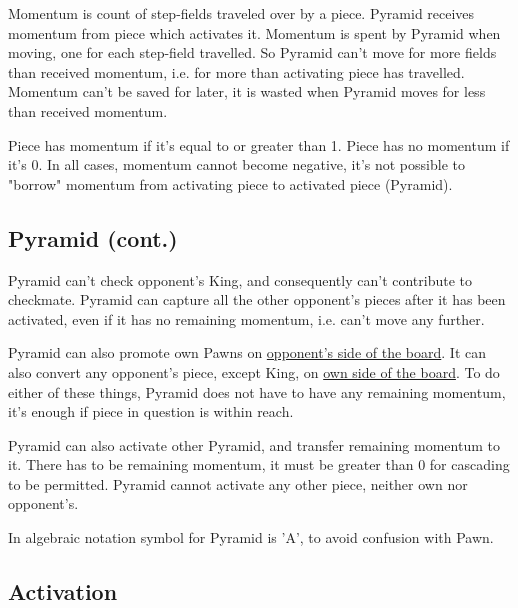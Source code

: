 Momentum is count of step-fields traveled over by a piece. Pyramid receives
momentum from piece which activates it. Momentum is spent by Pyramid when
moving, one for each step-field travelled. So Pyramid can't move for more
fields than received momentum, i.e. for more than activating piece has
travelled. Momentum can't be saved for later, it is wasted when Pyramid
moves for less than received momentum.

Piece has momentum if it's equal to or greater than 1. Piece has no momentum
if it's 0. In all cases, momentum cannot become negative, it's not possible
to "borrow" momentum from activating piece to activated piece (Pyramid).

\clearpage %

\subsection*{Pyramid (cont.)}

Pyramid can't check opponent's King, and consequently can't contribute to
checkmate. Pyramid can capture all the other opponent's pieces after it has
been activated, even if it has no remaining momentum, i.e. can't move any
further.

Pyramid can also promote own Pawns on
\hyperref[sec:Definitions/Sides of a chessboard]{opponent's side of the board}.
It can also convert any opponent's piece, except King, on
\hyperref[sec:Definitions/Sides of a chessboard]{own side of the board}.
To do either of these things, Pyramid does not have to have any remaining
momentum, it's enough if piece in question is within reach.

Pyramid can also activate other Pyramid, and transfer remaining momentum to it.
There has to be remaining momentum, it must be greater than 0 for cascading
to be permitted. Pyramid cannot activate any other piece, neither own nor
opponent's.

In algebraic notation symbol for Pyramid is 'A', to avoid confusion with Pawn.

\clearpage %

\subsection*{Activation}


